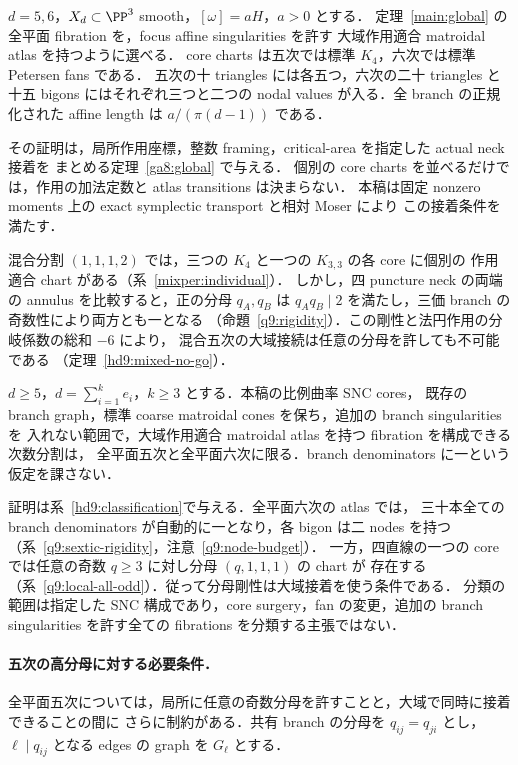 \begin{theorem}\label{main:action-atlas}
$d=5,6$，$X_d\subset\PP^3$ smooth，$[\omega]=aH$，$a>0$ とする．
定理~\ref{main:global} の全平面 fibration を，focus affine singularities を許す
大域作用適合 matroidal atlas を持つように選べる．
core charts は五次では標準 $K_4$，六次では標準 Petersen fans である．
五次の十 triangles には各五つ，六次の二十 triangles と十五 bigons にはそれぞれ三つと二つの
nodal values が入る．全 branch の正規化された affine length は $a/(\pi(d-1))$ である．
\end{theorem}

その証明は，局所作用座標，整数 framing，critical-area を指定した actual neck 接着を
まとめる定理~\ref{ga8:global} で与える．
個別の core charts を並べるだけでは，作用の加法定数と atlas transitions は決まらない．
本稿は固定 nonzero moments 上の exact symplectic transport と相対 Moser により
この接着条件を満たす．

混合分割 $(1,1,1,2)$ では，三つの $K_4$ と一つの $K_{3,3}$ の各 core に個別の
作用適合 chart がある（系~\ref{mixper:individual}）．
しかし，四 puncture neck の両端の annulus を比較すると，正の分母 $q_A,q_B$ は
$q_Aq_B\mid2$ を満たし，三価 branch の奇数性により両方とも一となる
（命題~\ref{q9:rigidity}）．この剛性と法円作用の分岐係数の総和 $-6$ により，
混合五次の大域接続は任意の分母を許しても不可能である
（定理~\ref{hd9:mixed-no-go}）．

\begin{theorem}\label{main:atlas-classification}
$d\ge5$，$d=\sum_{i=1}^ke_i$，$k\ge3$ とする．本稿の比例曲率 SNC cores，
既存の branch graph，標準 coarse matroidal cones を保ち，追加の branch singularities を
入れない範囲で，大域作用適合 matroidal atlas を持つ fibration を構成できる次数分割は，
全平面五次と全平面六次に限る．branch denominators に一という仮定を課さない．
\end{theorem}

証明は系~\ref{hd9:classification}で与える．全平面六次の atlas では，
三十本全ての branch denominators が自動的に一となり，各 bigon は二 nodes を持つ
（系~\ref{q9:sextic-rigidity}，注意~\ref{q9:node-budget}）．
一方，四直線の一つの core では任意の奇数 $q\ge3$ に対し分母 $(q,1,1,1)$ の chart が
存在する（系~\ref{q9:local-all-odd}）．従って分母剛性は大域接着を使う条件である．
分類の範囲は指定した SNC 構成であり，core surgery，fan の変更，追加の branch singularities
を許す全ての fibrations を分類する主張ではない．


\paragraph{五次の高分母に対する必要条件．}
全平面五次については，局所に任意の奇数分母を許すことと，大域で同時に接着できることの間に
さらに制約がある．共有 branch の分母を $q_{ij}=q_{ji}$ とし，
$\ell\mid q_{ij}$ となる edges の graph を $G_\ell$ とする．

